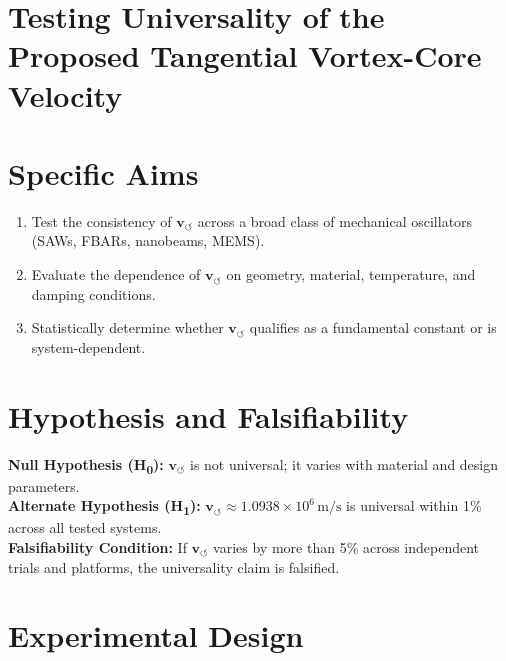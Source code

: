 \documentclass[11pt]{article}
\begin{document}
    \ifdefined\standalonechapter
    \section{\appendixtitle}
    \else
    \fi
    \section{\textbf{Testing Universality of the Proposed Tangential Vortex-Core Velocity}}
        \section*{Specific Aims}
        \begin{enumerate}[label=\textbf{Aim \arabic*.}]
            \item Test the consistency of \( \mathbf{v}_{\scriptscriptstyle\boldsymbol{\circlearrowleft}} \) across a broad class of mechanical oscillators (SAWs, FBARs, nanobeams, MEMS).
            \item Evaluate the dependence of \( \mathbf{v}_{\scriptscriptstyle\boldsymbol{\circlearrowleft}} \) on geometry, material, temperature, and damping conditions.
            \item Statistically determine whether \( \mathbf{v}_{\scriptscriptstyle\boldsymbol{\circlearrowleft}} \) qualifies as a fundamental constant or is system-dependent.
        \end{enumerate}

        \section*{Hypothesis and Falsifiability}
        \textbf{Null Hypothesis (H\textsubscript{0}):} \( \mathbf{v}_{\scriptscriptstyle\boldsymbol{\circlearrowleft}} \) is not universal; it varies with material and design parameters.\\
        \textbf{Alternate Hypothesis (H\textsubscript{1}):} \( \mathbf{v}_{\scriptscriptstyle\boldsymbol{\circlearrowleft}} \approx 1.0938 \times 10^6 \, \text{m/s} \) is universal within 1\% across all tested systems.\\

        \noindent\textbf{Falsifiability Condition:} If \( \mathbf{v}_{\scriptscriptstyle\boldsymbol{\circlearrowleft}} \) varies by more than 5\% across independent trials and platforms, the universality claim is falsified.

        \section*{Experimental Design}
\end{document}

